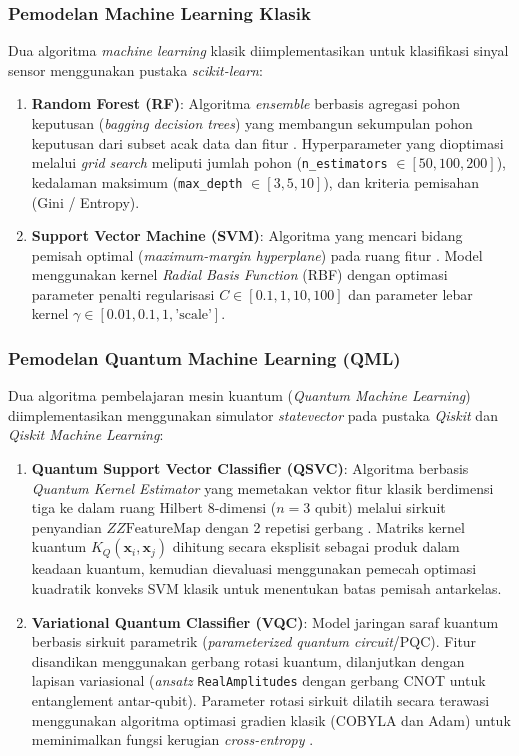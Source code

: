 \subsubsection{Pemodelan Machine Learning Klasik}
Dua algoritma \textit{machine learning} klasik diimplementasikan untuk klasifikasi sinyal sensor menggunakan pustaka \textit{scikit-learn}:
\begin{enumerate}
    \item \textbf{Random Forest (RF)}: Algoritma \textit{ensemble} berbasis agregasi pohon keputusan (\textit{bagging decision trees}) yang membangun sekumpulan pohon keputusan dari subset acak data dan fitur \cite{Breiman2001,Tyralis2019}. Hyperparameter yang dioptimasi melalui \textit{grid search} meliputi jumlah pohon (\texttt{n\_estimators} $\in [50, 100, 200]$), kedalaman maksimum (\texttt{max\_depth} $\in [3, 5, 10]$), dan kriteria pemisahan (Gini / Entropy).
    \item \textbf{Support Vector Machine (SVM)}: Algoritma yang mencari bidang pemisah optimal (\textit{maximum-margin hyperplane}) pada ruang fitur \cite{cortes1995support}. Model menggunakan kernel \textit{Radial Basis Function} (RBF) dengan optimasi parameter penalti regularisasi $C \in [0.1, 1, 10, 100]$ dan parameter lebar kernel $\gamma \in [0.01, 0.1, 1, \text{'scale'}]$.
\end{enumerate}

\subsubsection{Pemodelan Quantum Machine Learning (QML)}
Dua algoritma pembelajaran mesin kuantum (\textit{Quantum Machine Learning}) diimplementasikan menggunakan simulator \textit{statevector} pada pustaka \textit{Qiskit} dan \textit{Qiskit Machine Learning}:
\begin{enumerate}
    \item \textbf{Quantum Support Vector Classifier (QSVC)}: Algoritma berbasis \textit{Quantum Kernel Estimator} yang memetakan vektor fitur klasik berdimensi tiga ke dalam ruang Hilbert 8-dimensi ($n=3$ qubit) melalui sirkuit penyandian $ZZ\text{FeatureMap}$ dengan 2 repetisi gerbang \cite{havlicek2019supervised,schuld2019quantum}. Matriks kernel kuantum $K_Q(\mathbf{x}_i, \mathbf{x}_j)$ dihitung secara eksplisit sebagai produk dalam keadaan kuantum, kemudian dievaluasi menggunakan pemecah optimasi kuadratik konveks SVM klasik untuk menentukan batas pemisah antarkelas.
    \item \textbf{Variational Quantum Classifier (VQC)}: Model jaringan saraf kuantum berbasis sirkuit parametrik (\textit{parameterized quantum circuit}/PQC). Fitur disandikan menggunakan gerbang rotasi kuantum, dilanjutkan dengan lapisan variasional (\textit{ansatz} \texttt{RealAmplitudes} dengan gerbang CNOT untuk entanglement antar-qubit). Parameter rotasi sirkuit dilatih secara terawasi menggunakan algoritma optimasi gradien klasik (COBYLA dan Adam) untuk meminimalkan fungsi kerugian \textit{cross-entropy} \cite{schuld2019quantum}.
\end{enumerate}

